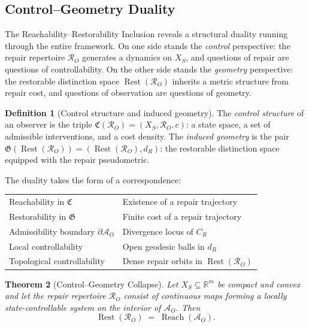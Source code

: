 \documentclass[12pt, oneside]{article}
\theoremstyle{plain}
\newtheorem{theorem}{Theorem}[section]
\theoremstyle{definition}
\newtheorem{definition}[theorem]{Definition}
\theoremstyle{remark}
\theoremstyle{definition}
\DeclareMathOperator{\Rest}{Rest}
\DeclareMathOperator{\Reach}{Reach}
\newcommand{\CR}{C_{\!R}}
\newcommand{\AO}{\mathcal{A}_O}
\newcommand{\bA}{\partial\mathcal{A}}
\newcommand{\Xsub}{X_S}
\begin{document}
\subsection{Control--Geometry Duality}

The Reachability--Restorability Inclusion reveals a structural duality
running through the entire framework.
On one side stands the \emph{control} perspective: the repair
repertoire $\mathcal{R}_O$ generates a dynamics on $\Xsub$, and
questions of repair are questions of controllability.
On the other side stands the \emph{geometry} perspective: the restorable
distinction space $\Rest(\mathcal{R}_O)$ inherits a metric structure
from repair cost, and questions of observation are questions of
geometry.

\begin{definition}[Control structure and induced geometry]
  The \emph{control structure} of an observer is the triple
  $\mathfrak{C}(\mathcal{R}_O) = (\Xsub, \mathcal{R}_O, c)$:
  a state space, a set of admissible interventions, and a cost
  density.
  The \emph{induced geometry} is the pair
  $\mathfrak{G}(\Rest(\mathcal{R}_O)) = (\Rest(\mathcal{R}_O), d_R)$:
  the restorable distinction space equipped with the repair
  pseudometric.
\end{definition}

The duality takes the form of a correspondence:

\begin{center}
\renewcommand{\arraystretch}{1.4}
\begin{tabular}{l@{\quad$\longleftrightarrow$\quad}l}
  Reachability in $\mathfrak{C}$ & Existence of a repair trajectory \\
  Restorability in $\mathfrak{G}$ & Finite cost of a repair trajectory \\
  Admissibility boundary $\bA_O$ & Divergence locus of $\CR$ \\
  Local controllability & Open geodesic balls in $d_R$ \\
  Topological controllability & Dense repair orbits in $\Rest(\mathcal{R}_O)$ \\
\end{tabular}
\end{center}

\begin{theorem}[Control--Geometry Collapse]
  Let $\Xsub \subseteq \mathbb{R}^m$ be compact and convex and let
  the repair repertoire $\mathcal{R}_O$ consist of continuous maps
  forming a locally state-controllable system on the interior of
  $\AO$.
  Then
  \[
    \Rest(\mathcal{R}_O) \;=\; \Reach(\AO).
  \]
  \label{thm:cg-collapse}
\end{theorem}
\end{document}
